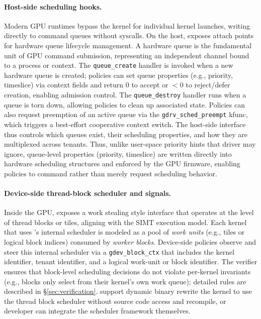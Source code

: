 \paragraph{Host-side scheduling hooks.}
Modern GPU runtimes bypass the kernel for individual kernel launches, writing directly to command queues without syscalls. On the host, \sys exposes attach points for hardware queue lifecycle management. A hardware queue is the fundamental unit of GPU command submission, representing an independent channel bound to a process or context. The \texttt{queue\_create} handler is invoked when a new hardware queue is created; policies can set queue properties (e.g., priority, timeslice) via context fields and return 0 to accept or $<$0 to reject/defer creation, enabling admission control. The \texttt{queue\_destroy} handler runs when a queue is torn down, allowing policies to clean up associated state. Policies can also request preemption of an active queue via the \texttt{gdrv\_sched\_preempt} kfunc, which triggers a best-effort cooperative context switch. The host-side interface thus controls which queues exist, their scheduling properties, and how they are multiplexed across tenants. Thus, unlike user-space priority hints that driver may ignore, queue-level properties (priority, timeslice) are written directly into hardware scheduling structures and enforced by the GPU firmware, enabling policies to command rather than merely request scheduling behavior.

\paragraph{Device-side thread-block scheduler and signals.} Inside the GPU, \sys exposes a work stealing style interface that operates at the level of thread blocks or tiles, aligning with the SIMT execution model. Each kernel that uses \sys's internal scheduler is modeled as a pool of \emph{work units} (e.g., tiles or logical block indices) consumed by \emph{worker blocks}. Device-side policies observe and steer this internal scheduler via a \texttt{gdev\_block\_ctx} that includes the kernel identifier, tenant identifier, and a logical work-unit or block identifier. The verifier ensures that block-level scheduling decisions do not violate per-kernel invariants (e.g., blocks only select from their kernel's own work queue); detailed rules are described in \S\ref{sec:verification}. \sys support dynamic binary rewrite the kernel to use the thread block scheduler without source code access and recompile, or developer can integrate the scheduler framework themselves.


